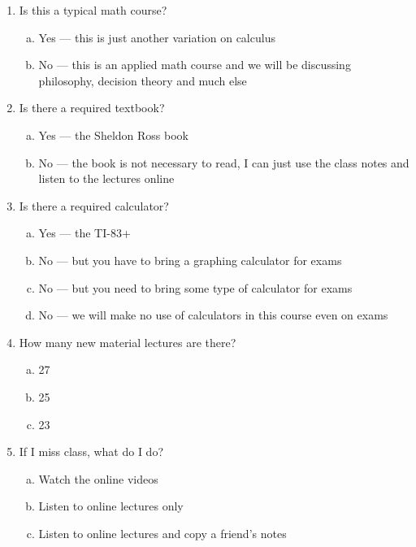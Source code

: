 \documentclass[12pt]{article}
\begin{document}
\begin{enumerate}[1.]
\item Is this a typical math course?

\begin{enumerate}[(a)]
\item Yes --- this is just another variation on calculus
\item No --- this is an applied math course and we will be discussing philosophy, decision theory and much else
\end{enumerate}

\item Is there a required textbook?

\begin{enumerate}[(a)]
\item Yes --- the Sheldon Ross book
\item No --- the book is not necessary to read, I can just use the class notes and listen to the lectures online
\end{enumerate}

\item Is there a required calculator?

\begin{enumerate}[(a)]
\item Yes --- the TI-83+
\item No --- but you have to bring a graphing calculator for exams
\item No --- but you need to bring some type of calculator for exams
\item No --- we will make no use of calculators in this course even on exams
\end{enumerate}

\item How many new material lectures are there?

\begin{enumerate}[(a)]
\item 27
\item 25
\item 23
\end{enumerate}


\item If I miss class, what do I do?

\begin{enumerate}[(a)]
\item Watch the online videos
\item Listen to online lectures only
\item Listen to online lectures and copy a friend's notes
\end{enumerate}


\end{enumerate}
\end{document}
